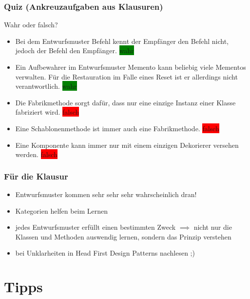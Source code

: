 \documentclass[18pt]{beamer}
\begin{document}
	\begin{frame}
		\frametitle{Quiz (Ankreuzaufgaben aus Klausuren)}
		Wahr oder falsch?
		\begin{itemize}
			\item Bei dem Entwurfsmuster Befehl kennt der Empfänger den Befehl nicht, jedoch der Befehl den Empfänger. \pause \colorbox{green}{wahr} \pause
			\item Ein Aufbewahrer im Entwurfsmuster Memento kann beliebig viele Mementos verwalten. Für die Restauration im Falle eines Reset ist er allerdings nicht verantwortlich. \pause \colorbox{green}{wahr} \pause
			\item Die Fabrikmethode sorgt dafür, dass nur eine einzige Instanz einer Klasse fabriziert wird. \pause \colorbox{red}{falsch} \pause 
			\item Eine Schablonenmethode ist immer auch eine Fabrikmethode. \pause \colorbox{red}{falsch} \pause
			\item Eine Komponente kann immer nur mit einem einzigen Dekorierer versehen werden. \pause \colorbox{red}{falsch}
		\end{itemize}
	\end{frame}
	
	
	\begin{frame}
		\frametitle{Für die Klausur}
		\begin{itemize}
			\item Entwurfsmuster kommen sehr sehr sehr wahrscheinlich dran! \pause 
			\item Kategorien helfen beim Lernen \pause
			\item jedes Entwurfsmuster erfüllt einen bestimmten Zweck 
			\linebreak $\implies$ nicht nur die Klassen und Methoden auswendig lernen, sondern das Prinzip verstehen \pause
			\item bei Unklarheiten in Head First Design Patterns nachlesen ;)
		\end{itemize}
	\end{frame}
	
\section{Tipps}
\end{document}
